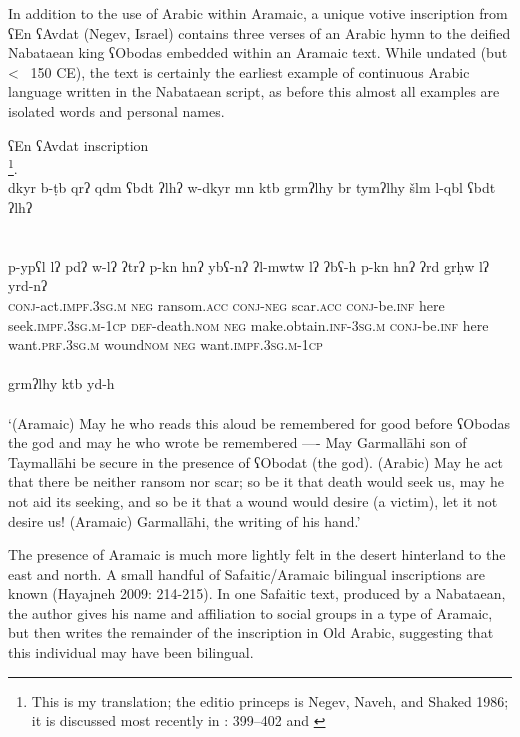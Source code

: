 \documentclass[output=paper]{langsci/langscibook}
\begin{document}
In addition to the use of Arabic within Aramaic, a unique votive inscription from ʕEn ʕAvdat (Negev, Israel) contains three verses of an Arabic hymn to the deified Nabataean king ʕObodas embedded within an Aramaic text. While undated (but < ~150 CE), the text is certainly the earliest example of continuous Arabic language written in the Nabataean script, as before this almost all examples are isolated words and personal names.

\ea ʕEn ʕAvdat inscription \\ \footnote{This is my translation; the editio princeps is Negev, Naveh, and Shaked 1986; it is discussed most recently in \citep{fiemaetal2015}: 399–402 and \citep{kropp2017}}.
 \\
\gll   dkyr b-ṭb q{r}ʔ qdm ʕbdt ʔlhʔ w-dkyr mn ktb grmʔlhy br tymʔlhy šlm l-qbl ʕbdt ʔlhʔ \\
       \\ %

 \\
\gll   p-ypʕl lʔ pdʔ w-lʔ ʔtrʔ p-kn hnʔ ybʕ-nʔ ʔl-mwtw lʔ ʔbʕ-h p-kn hnʔ ʔrd grḥw lʔ yrd-nʔ \\
       \textsc{conj}-act.\textsc{impf.3sg.m} \textsc{neg} ransom.\textsc{acc} \textsc{conj}-\textsc{neg} scar.\textsc{acc} \textsc{conj}-be.\textsc{inf} here seek.\textsc{impf.3sg.m-1cp} \textsc{def}-death.\textsc{nom} \textsc{neg} make.obtain.\textsc{inf-3sg.m} \textsc{conj}-be.\textsc{inf} here want.\textsc{prf.3sg.m} wound\textsc{nom} \textsc{neg} want.\textsc{impf.3sg.m-1cp} \\
      
 \\
\gll   grmʔlhy ktb yd-h \\
       \\ %
       
\glt `(Aramaic) May he who reads this aloud be remembered for good before ʕObodas the god and may he who wrote be remembered ---- May Garmallāhi son of Taymallāhi be secure in the presence of ʕObodat (the god). (Arabic) May he act that there be neither ransom nor scar; so be it that death would seek us, may he not aid its seeking, and so be it that a wound would desire (a victim), let it not desire us! (Aramaic) Garmallāhi, the writing of his hand.’ \\
\z
\z

The presence of Aramaic is much more lightly felt in the desert hinterland to the east and north. A small handful of Safaitic/Aramaic bilingual inscriptions are known (Hayajneh 2009: 214-215). In one Safaitic text, produced by a Nabataean, the author gives his name and affiliation to social groups in a type of Aramaic, but then writes the remainder of the inscription in Old Arabic, suggesting that this individual may have been bilingual. 
\end{document}
